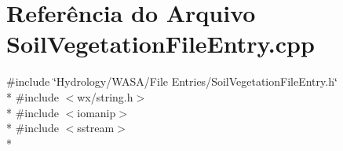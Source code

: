 \section{Referência do Arquivo Soil\+Vegetation\+File\+Entry.\+cpp}
\label{_soil_vegetation_file_entry_8cpp}
{\ttfamily \#include \char`\"{}Hydrology/\+W\+A\+S\+A/\+File Entries/\+Soil\+Vegetation\+File\+Entry.\+h\char`\"{}}\\*
{\ttfamily \#include $<$wx/string.\+h$>$}\\*
{\ttfamily \#include $<$iomanip$>$}\\*
{\ttfamily \#include $<$sstream$>$}\\*
